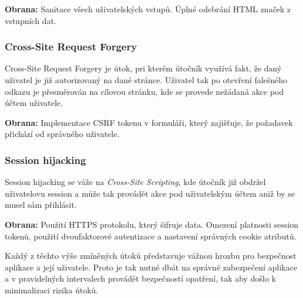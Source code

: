\textbf{Obrana:} Sanitace všech uživatelských vstupů. Úplné odebrání HTML značek z vstupních dat.

\subsubsection*{Cross-Site Request Forgery}
\label{subsubsec:security-attacks-cross-site-request-forgery}
Cross-Site Request Forgery je útok, pri kterém útočník využívá fakt, že daný uživatel je již autorizovaný na dané stránce. Uživatel tak po otevření falešného odkazu je přesměrován na cílovou stránku, kde se provede nežádaná akce pod účtem uživatele.

\textbf{Obrana:} Implementace CSRF tokenu v formuláři, který zajišťuje, že požadavek přichází od správného uživatele.

\subsubsection*{Session hijacking}
\label{subsubsec:security-attacks-session-hijacking}
Session hijacking se váže na \textit{Cross-Site Scripting}, kde útočník již obdržel uživatelovu session a může tak provádět akce pod uživatelským účtem aniž by se musel sám přihlásit.

\textbf{Obrana:} Použití HTTPS protokolu, který šifruje data. Omezení platnosti session tokenů, použití dvoufaktorové autentizace a nastavení správných cookie atributů.
\newline

Každý z těchto výše zmíněných útoků představuje vážnou hrozbu pro bezpečnost aplikace a její uživatele. Proto je tak nutné dbát na správné zabezpečení aplikace a v pravidelných intervalech provádět bezpečností opatření, tak aby došlo k minimalizaci rizika útoků.

\endinput
